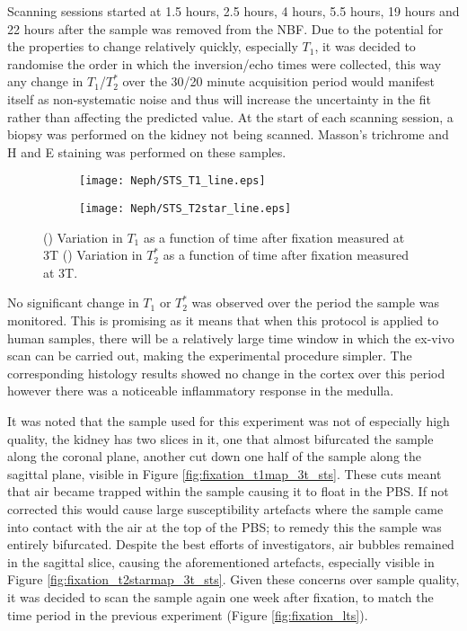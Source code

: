 Scanning sessions started at 1.5 hours, 2.5 hours, 4 hours, 5.5 hours, 19 hours and 22 hours after the sample was removed from the \ac{NBF}. Due to the potential for the properties to change relatively quickly, especially $T_1$, it was decided to randomise the order in which the inversion/echo times were collected, this way any change in $T_1$/$T_2^*$ over the 30/20 minute acquisition period would manifest itself as non-systematic noise and thus will increase the uncertainty in the fit rather than affecting the predicted value. At the start of each scanning session, a biopsy was performed on the kidney not being scanned. Masson's trichrome and \ac{H and E} staining was performed on these samples.

\begin{figure}[H]
	\centering
	\begin{subfigure}[c]{0.47\textwidth}
		\centering
		\texttt{[image: Neph/STS\_T1\_line.eps]}
		\caption{}
		\label{fig:fixation_t1_3t_sts}
	\end{subfigure}
	\hfill
	\begin{subfigure}[c]{0.47\textwidth}
		\centering
		\texttt{[image: Neph/STS\_T2star\_line.eps]}
		\caption{}
		\label{fig:fixation_t2star_3t_sts}
	\end{subfigure}
	\caption{() Variation in $T_1$ as a function of time after fixation measured at 3T () Variation in $T_2^*$ as a function of time after fixation measured at 3T.}
	\label{fig:fixation_sts}
\end{figure}

No significant change in $T_1$ or $T_2^*$ was observed over the period the sample was monitored. This is promising as it means that when this protocol is applied to human samples, there will be a relatively large time window in which the ex-vivo scan can be carried out, making the experimental procedure simpler. The corresponding histology results showed no change in the cortex over this period however there was a noticeable inflammatory response in the medulla.

It was noted that the sample used for this experiment was not of especially high quality, the kidney has two slices in it, one that almost bifurcated the sample along the coronal plane, another cut down one half of the sample along the sagittal plane, visible in Figure \ref{fig:fixation_t1map_3t_sts}. These cuts meant that air became trapped within the sample causing it to float in the \ac{PBS}. If not corrected this would cause large susceptibility artefacts where the sample came into contact with the air at the top of the \ac{PBS}; to remedy this the sample was entirely bifurcated. Despite the best efforts of investigators, air bubbles remained in the sagittal slice, causing the aforementioned artefacts, especially visible in Figure \ref{fig:fixation_t2starmap_3t_sts}. Given these concerns over sample quality, it was decided to scan the sample again one week after fixation, to match the time period in the previous experiment (Figure \ref{fig:fixation_lts}).

